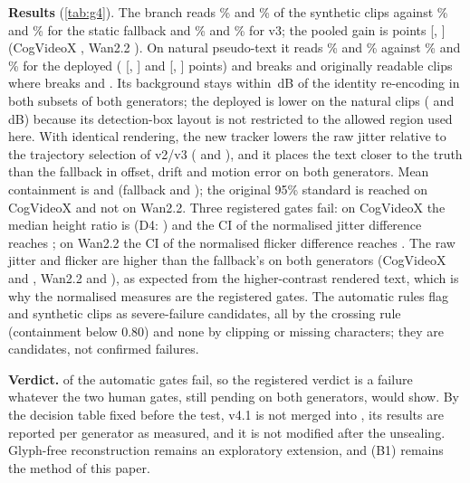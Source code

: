 \textbf{Results} (\cref{tab:g4}). The branch reads \gTCogRead\% and \gTWanRead\% of the synthetic clips against \gTCogReadFb\% and \gTWanReadFb\% for the static fallback and \gTCogReadVthree\% and \gTWanReadVthree\% for v3; the pooled gain is \gTReadGain{} points [\gTReadGainLo, \gTReadGainHi] (CogVideoX \gTCogReadGain, Wan2.2 \gTWanReadGain). On natural pseudo-text it reads \gTCogNatRead\% and \gTWanNatRead\% against \gTCogNatBone\% and \gTWanNatBone\% for the deployed \method (\gTCogNatGain{} [\gTCogNatGainLo, \gTCogNatGainHi] and \gTWanNatGain{} [\gTWanNatGainLo, \gTWanNatGainHi] points) and breaks \gTCogNatBroken{} and \gTWanNatBroken{} originally readable clips where \method breaks \gTCogNatBoneBroken{} and \gTWanNatBoneBroken. Its background stays within \gTBgMaxGap\,dB of the identity re-encoding in both subsets of both generators; the deployed \method is lower on the natural clips (\gTCogBgNatBone{} and \gTWanBgNatBone\,dB) because its detection-box layout is not restricted to the allowed region used here. With identical rendering, the new tracker lowers the raw jitter relative to the trajectory selection of v2/v3 (\gTCogCtrlJit{} and \gTWanCtrlJit), and it places the text closer to the truth than the fallback in offset, drift and motion error on both generators. Mean containment is \gTCogCont{} and \gTWanCont{} (fallback \gTCogContFb{} and \gTWanContFb); the original 95\% standard is reached on CogVideoX and not on Wan2.2. Three registered gates fail: on CogVideoX the median height ratio is \gTCogHeight{} (D4: \gDCogHeight) and the CI of the normalised jitter difference reaches \gTCogJitNHi; on Wan2.2 the CI of the normalised flicker difference reaches \gTWanFlkNHi. The raw jitter and flicker are higher than the fallback's on both generators (CogVideoX \gTCogJitRaw{} and \gTCogFlkRaw, Wan2.2 \gTWanJitRaw{} and \gTWanFlkRaw), as expected from the higher-contrast rendered text, which is why the normalised measures are the registered gates. The automatic rules flag \gTCogSevere{} and \gTWanSevere{} synthetic clips as severe-failure candidates, all by the crossing rule (containment below 0.80) and none by clipping or missing characters; they are candidates, not confirmed failures.

\textbf{Verdict.} \gTGatesFailed{} of the \gTGatesTotal{} automatic gates fail, so the registered verdict is a failure whatever the two human gates, still pending on both generators, would show. By the decision table fixed before the test, v4.1 is not merged into \method, its results are reported per generator as measured, and it is not modified after the unsealing. Glyph-free reconstruction remains an exploratory extension, and \method (B1) remains the method of this paper.

